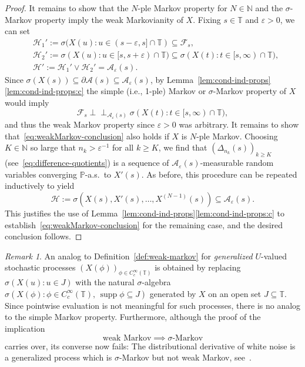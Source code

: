 \documentclass[reqno]{amsart}
\numberwithin{equation}{section}
\newcommand{\bbP}{\mathbb{P}}
\newcommand{\bbT}{\mathbb{T}}
\newcommand{\N}{\mathbb{N}}
\newcommand{\cF}{\mathcal{F}}
\newcommand{\cH}{\mathcal{H}}
\newcommand{\ind}{\perp\!\!\!\perp}
\newcommand{\supp}{\operatorname{supp}}
\theoremstyle{remark}
\newtheorem{remark}[lemma]{Remark}
\theoremstyle{definition}
\begin{document}
\begin{proof}
	It remains
	to show that the $N$-ple Markov property for $N \in \N$ 
	and the $\sigma$-Markov property imply the weak Markovianity of $X$.
	Fixing $s \in \bbT$ and $\varepsilon > 0$, we can set
	\begin{equation}\label{eq:H1tilde-H2tilde}
		\begin{aligned}
			&\cH_1' := \sigma(X(u) : u \in (s - \varepsilon, s] \cap \bbT) \subseteq \cF_s, \\
			&\cH_2' := \sigma(X(u) : u \in [s, s+\varepsilon) \cap \bbT) \subseteq \sigma( X(t) : t \in [s,\infty) \cap \bbT ), \\
			&\cH' := \cH_1' \vee \cH_2' = \mathscr A_\varepsilon(s).
		\end{aligned}
	\end{equation}
	Since $\sigma(X(s)) \subseteq \partial \mathscr A(s) \subseteq \mathscr A_\varepsilon(s)$,
	by Lemma~\ref{lem:cond-ind-props}\ref{lem:cond-ind-props:c} the simple (i.e., 1-ple) Markov or $\sigma$-Markov property
	of $X$ would imply
	\begin{equation}\label{eq:weakMarkov-conclusion}
		\cF_s \ind_{\mathscr A_\varepsilon(s)} \sigma( X(t) : t \in [s,\infty) \cap \bbT ),
	\end{equation}
	and thus the weak Markov property since $\varepsilon > 0$ was arbitrary.
	It remains to show that~\eqref{eq:weakMarkov-conclusion} also holds if $X$ is $N$-ple Markov.
	Choosing $K \in \N$ so large that $n_k > \varepsilon^{-1}$ 
	for all $k \ge K$, 
	we find that $(\Delta_{n_k}(s))_{k \ge K}$ (see~\eqref{eq:difference-quotients})
	is a sequence of 
	$\mathscr A_\varepsilon(s)$-measurable random variables
	converging $\bbP$-a.s.\ to $X'(s)$. As before, this procedure
	can be repeated inductively to yield
	\[
	\cH := \sigma(X(s), X'(s), \dots, X^{(N-1)}(s))
	\subseteq 
	\mathscr A_\varepsilon(s).
	\]
	This justifies the use of Lemma~\ref{lem:cond-ind-props}\ref{lem:cond-ind-props:c}
	to establish~\eqref{eq:weakMarkov-conclusion}
	for the remaining case, and the desired conclusion follows.
\end{proof}

\begin{remark}\label{rem:Markov-relations-weak}
	An analog to Definition~\ref{def:weak-markov} for \emph{generalized} $U$-valued stochastic processes
	$(X(\phi))_{\phi \in C_c^\infty(\bbT)}$
	is obtained by replacing $\sigma(X(u) : u \in J)$
	with the natural $\sigma$-algebra
	$\sigma(X(\phi) : \phi \in C_c^\infty(\bbT), \, \supp \phi \subseteq J)$ 
	generated by $X$ on an open set $J \subseteq \bbT$.
	Since pointwise evaluation is not meaningful for such processes, 
	there is no analog to the simple Markov property.
	Furthermore, 
	although the proof of the implication
	\[
	\text{weak Markov} \implies \text{$\sigma$-Markov}
	\]
	carries over, its converse now fails:
	The distributional derivative of white noise is 
	a generalized process which is $\sigma$-Markov but not weak Markov, see~\cite[p.~62]{Rozanov1982}.
\end{remark}
\end{document}
